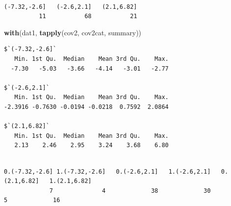 \documentclass[
  12pt,
]{book}
\newenvironment{Shaded}{\begin{snugshade}}{\end{snugshade}}
\newcommand{\CommentTok}[1]{\textcolor[rgb]{0.56,0.35,0.01}{\textit{#1}}}
\newcommand{\DataTypeTok}[1]{\textcolor[rgb]{0.13,0.29,0.53}{#1}}
\newcommand{\DecValTok}[1]{\textcolor[rgb]{0.00,0.00,0.81}{#1}}
\newcommand{\KeywordTok}[1]{\textcolor[rgb]{0.13,0.29,0.53}{\textbf{#1}}}
\newcommand{\NormalTok}[1]{#1}
\newcommand{\OperatorTok}[1]{\textcolor[rgb]{0.81,0.36,0.00}{\textbf{#1}}}
\newcommand{\StringTok}[1]{\textcolor[rgb]{0.31,0.60,0.02}{#1}}
\theoremstyle{definition}
\theoremstyle{definition}
\theoremstyle{definition}
\theoremstyle{remark}
\begin{document}
\begin{verbatim}

(-7.32,-2.6]   (-2.6,2.1]   (2.1,6.82] 
          11           68           21 
\end{verbatim}

\begin{Shaded}
\begin{Highlighting}[]
\KeywordTok{with}\NormalTok{(dat1, }\KeywordTok{tapply}\NormalTok{(cov2, cov2cat, summary))}
\end{Highlighting}
\end{Shaded}

\begin{verbatim}
$`(-7.32,-2.6]`
   Min. 1st Qu.  Median    Mean 3rd Qu.    Max. 
  -7.30   -5.03   -3.66   -4.14   -3.01   -2.77 

$`(-2.6,2.1]`
   Min. 1st Qu.  Median    Mean 3rd Qu.    Max. 
-2.3916 -0.7630 -0.0194 -0.0218  0.7592  2.0864 

$`(2.1,6.82]`
   Min. 1st Qu.  Median    Mean 3rd Qu.    Max. 
   2.13    2.46    2.95    3.24    3.68    6.80 
\end{verbatim}

\begin{Shaded}
\end{Shaded}

\begin{verbatim}

0.(-7.32,-2.6] 1.(-7.32,-2.6]   0.(-2.6,2.1]   1.(-2.6,2.1]   0.(2.1,6.82]   1.(2.1,6.82] 
             7              4             38             30              5             16 
\end{verbatim}

\begin{Shaded}
\end{Shaded}
\end{document}
